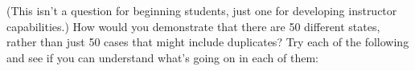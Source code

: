 %
\begin{problem}
 (This isn't a question for beginning students, just one
for developing instructor capabilities.)  
How would you demonstrate that there are 50
different states, rather than just 50 cases that might include
duplicates?  
Try each of the following
and see if you can understand what's going on in each of them:
\begin{knitrout}
\end{knitrout}

\end{problem}

